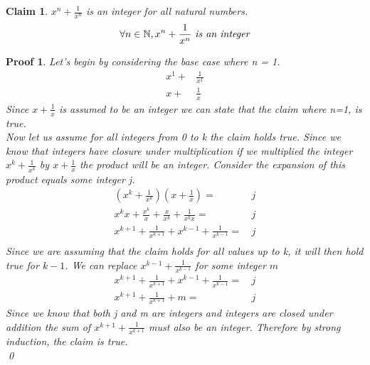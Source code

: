 \documentclass{article}
\newtheorem*{claim}{Claim}
\newtheorem*{poof}{Proof}
\begin{document}
\begin{claim}
     $x^n+\frac{1}{x^n}$ is an integer for all natural numbers.
     $$\forall n \in \mathbb{N}, x^n +\frac{1}{x^n}\text{ \emph{is an integer}}$$
\end{claim}
\begin{poof}
     Let's begin by considering the base case where n = 1.
    \begin{align*}
         x^1+&\frac{1}{x^1}\\         x+&\frac{1}{x}
    \end{align*}
    Since $x+\frac{1}{x}$ is assumed to be an integer we can state that the claim where n=1, is true.
    \\
    
    \noindent Now let us assume for all integers from 0 to k the claim holds true. Since we know that integers have closure under multiplication if we multiplied the integer $x^k+\frac{1}{x^k}$ by $x+\frac{1}{x}$ the product will be an integer. Consider the expansion of this product equals some integer j.
    \begin{align*}
        (x^k+\frac{1}{x^k})(x+\frac{1}{x})=&\,j\\
        x^kx+\frac{x^k}{x}+\frac{x}{x^k}+\frac{1}{x^kx}=&\,j\\
        x^{k+1}+\frac{1}{x^{k+1}}+x^{k-1}+\frac{1}{x^{k-1}}=&\,j\\
    \end{align*}
    Since we are assuming that the claim holds for all values up to k, it will then hold true for $k-1$. We can replace $x^{k-1}+\frac{1}{x^{k-1}}$ for some integer $m$
    \begin{align*}
        x^{k+1}+\frac{1}{x^{k+1}}+x^{k-1}+\frac{1}{x^{k-1}}=&\,j\\
        x^{k+1}+\frac{1}{x^{k+1}}+m=&\,j
    \end{align*}
    Since we know that both j and m are integers and integers are closed under addition the sum of $x^{k+1}+\frac{1}{x^{k+1}}$ must also be an integer. Therefore by strong induction, the claim is true.
    \\
    \qed
\end{poof}

\newpage
\end{document}
